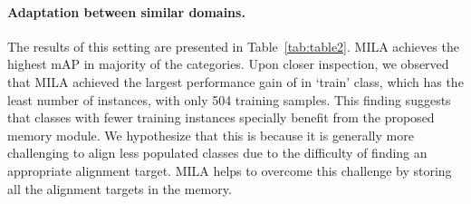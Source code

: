 \documentclass{bmvc2k}
\begin{document}
\paragraph{Adaptation between similar domains.}
The results of this setting are presented in Table~\ref{tab:table2}. MILA achieves the highest mAP in majority of the categories. Upon closer inspection, we observed that MILA achieved the largest performance gain of  in `train' class, which has the least number of instances, with only 504 training samples. This finding suggests that classes with fewer training instances specially benefit from the proposed memory module. We hypothesize that this is because it is generally more challenging to align less populated classes due to the difficulty of finding an appropriate alignment target. MILA helps to overcome this challenge by storing all the alignment targets in the memory.
\end{document}
